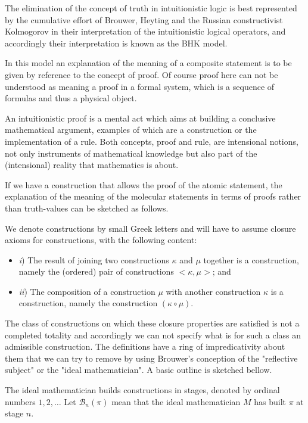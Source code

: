 \documentclass[12pt]{article}
\begin{document}
The elimination of the concept of truth in intuitionistic logic is best represented by the cumulative effort of Brouwer, Heyting and the Russian constructivist Kolmogorov in their interpretation of the intuitionistic logical operators, and accordingly their interpretation is known as the BHK model.

In this model an explanation of the meaning of a composite statement is to be given by reference to the concept of proof. Of course proof here can not be understood as meaning a proof in a formal system, which is a sequence of formulas and thus a physical object.

An intuitionistic proof is a mental act which aims at building a conclusive mathematical argument, examples of which are a construction or the implementation of a rule. Both concepts, proof and rule, are intensional notions, not only instruments of mathematical knowledge but also part of the (intensional) reality that mathematics is about.

If we have a construction that allows the proof of the atomic statement, the explanation of the meaning of the molecular statements in terms of proofs rather than truth-values can be sketched as follows.

We denote constructions by small Greek letters and will have to assume closure axioms for constructions, with the following content:

\begin{itemize}
\item \emph{i}) The result of joining two constructions $\kappa$ and $\mu$ together is a construction, namely the (ordered) pair of constructions $<\kappa, \mu>$; and 
\item \emph{ii}) The composition of a construction $\mu$ with another construction $\kappa$ is a construction, namely the construction $(\kappa \circ \mu)$.
\end{itemize}

The class of constructions on which these closure properties are satisfied is not a completed totality and accordingly we can not specify what is for such a class an admissible construction. The definitions have a ring of impredicativity about them that we can try to remove by using Brouwer's conception of the "reflective subject" or the "ideal mathematician". A basic outline is sketched bellow.  

The ideal mathematician builds constructions in stages, denoted by ordinal numbers $1, 2, \ldots$ Let $\mathcal{B}_n (\pi)$ mean that the ideal mathematician $M$ has built $\pi$ at stage $n$.
\end{document}

